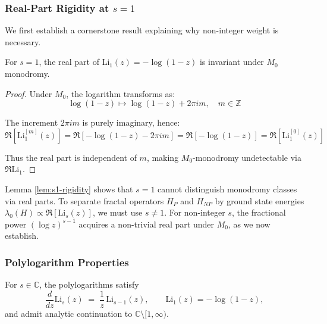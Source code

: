 \subsubsection{Real-Part Rigidity at $s=1$}

We first establish a cornerstone result explaining why non-integer weight is necessary.

\begin{lemma}[Real-Part Invariance at $s=1$]\label{lem:s1-rigidity}
For $s=1$, the real part of $\mathrm{Li}_1(z) = -\log(1-z)$ is invariant under $M_0$ monodromy.
\end{lemma}

\begin{proof}
Under $M_0$, the logarithm transforms as:
\begin{equation}
\log(1-z) \mapsto \log(1-z) + 2\pi i m, \quad m \in \mathbb{Z}
\end{equation}

The increment $2\pi i m$ is purely imaginary, hence:
\begin{equation}
\Re[\mathrm{Li}_1^{[m]}(z)] = \Re[-\log(1-z) - 2\pi i m] = \Re[-\log(1-z)] = \Re[\mathrm{Li}_1^{[0]}(z)]
\end{equation}

Thus the real part is independent of $m$, making $M_0$-monodromy undetectable via $\Re \mathrm{Li}_1$.
\end{proof}

\begin{remark}
Lemma \ref{lem:s1-rigidity} shows that $s=1$ cannot distinguish monodromy classes via real parts. To separate fractal operators $H_P$ and $H_{NP}$ by ground state energies $\lambda_0(H) \propto \Re[\mathrm{Li}_s(z)]$, we must use $s \neq 1$. For non-integer $s$, the fractional power $(\log z)^{s-1}$ acquires a non-trivial real part under $M_0$, as we now establish.
\end{remark}

\subsubsection{Polylogarithm Properties}

\begin{lemma}\label{lem:polylog-ladder}
For $s\in\mathbb{C}$, the polylogarithms satisfy
\[
\frac{d}{dz}\mathrm{Li}_s(z) \;=\; \frac{1}{z}\,\mathrm{Li}_{s-1}(z),
\qquad
\mathrm{Li}_1(z)=-\log(1-z),
\]
and admit analytic continuation to $\mathbb{C}\setminus[1,\infty)$.
\end{lemma}

